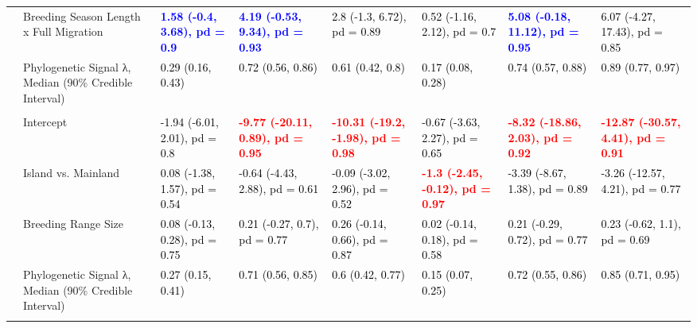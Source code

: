 {\begin{tabular}[t]{llllllll}
 & Breeding Season Length x Full Migration & \textcolor{blue}{\textbf{1.58 (-0.4, 3.68), pd = 0.9}} & \textcolor{blue}{\textbf{4.19 (-0.53, 9.34), pd = 0.93}} & \textcolor{black}{2.8 (-1.3, 6.72), pd = 0.89} & \textcolor{black}{0.52 (-1.16, 2.12), pd = 0.7} & \textcolor{blue}{\textbf{5.08 (-0.18, 11.12), pd = 0.95}} & \textcolor{black}{6.07 (-4.27, 17.43), pd = 0.85}\\
 & Phylogenetic Signal λ, Median (90\% Credible Interval) & \textcolor{black}{0.29 (0.16, 0.43)} & \textcolor{black}{0.72 (0.56, 0.86)} & \textcolor{black}{0.61 (0.42, 0.8)} & \textcolor{black}{0.17 (0.08, 0.28)} & \textcolor{black}{0.74 (0.57, 0.88)} & \textcolor{black}{0.89 (0.77, 0.97)}\\
\addlinespace[0.3em]
\multicolumn{1}{l}{\textbf{Breeding Spacing}}\\
\hspace{1em} & Intercept & \textcolor{black}{-1.94 (-6.01, 2.01), pd = 0.8} & \textcolor{red}{\textbf{-9.77 (-20.11, 0.89), pd = 0.95}} & \textcolor{red}{\textbf{-10.31 (-19.2, -1.98), pd = 0.98}} & \textcolor{black}{-0.67 (-3.63, 2.27), pd = 0.65} & \textcolor{red}{\textbf{-8.32 (-18.86, 2.03), pd = 0.92}} & \textcolor{red}{\textbf{-12.87 (-30.57, 4.41), pd = 0.91}}\\
\hspace{1em} & Island vs. Mainland & \textcolor{black}{0.08 (-1.38, 1.57), pd = 0.54} & \textcolor{black}{-0.64 (-4.43, 2.88), pd = 0.61} & \textcolor{black}{-0.09 (-3.02, 2.96), pd = 0.52} & \textcolor{red}{\textbf{-1.3 (-2.45, -0.12), pd = 0.97}} & \textcolor{black}{-3.39 (-8.67, 1.38), pd = 0.89} & \textcolor{black}{-3.26 (-12.57, 4.21), pd = 0.77}\\
\hspace{1em} & Breeding Range Size & \textcolor{black}{0.08 (-0.13, 0.28), pd = 0.75} & \textcolor{black}{0.21 (-0.27, 0.7), pd = 0.77} & \textcolor{black}{0.26 (-0.14, 0.66), pd = 0.87} & \textcolor{black}{0.02 (-0.14, 0.18), pd = 0.58} & \textcolor{black}{0.21 (-0.29, 0.72), pd = 0.77} & \textcolor{black}{0.23 (-0.62, 1.1), pd = 0.69}\\
\hspace{1em} & Phylogenetic Signal λ, Median (90\% Credible Interval) & \textcolor{black}{0.27 (0.15, 0.41)} & \textcolor{black}{0.71 (0.56, 0.85)} & \textcolor{black}{0.6 (0.42, 0.77)} & \textcolor{black}{0.15 (0.07, 0.25)} & \textcolor{black}{0.72 (0.55, 0.86)} & \textcolor{black}{0.85 (0.71, 0.95)}\\
\addlinespace[0.3em]
\multicolumn{1}{l}{\textbf{Breeding Sympatry}}\\

\end{tabular}}
